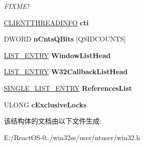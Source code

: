 \begin{DoxyCompactItemize}
\begin{DoxyCompactList}\small\item\em F\+I\+X\+M\+E! \end{DoxyCompactList}\item 
\mbox{\label{struct___t_h_r_e_a_d_i_n_f_o_a4919788349996364c773ff0e360948fd}} 
\hyperlink{struct___c_l_i_e_n_t_t_h_r_e_a_d_i_n_f_o}{C\+L\+I\+E\+N\+T\+T\+H\+R\+E\+A\+D\+I\+N\+FO} {\bfseries cti}
\item 
\mbox{\label{struct___t_h_r_e_a_d_i_n_f_o_a59f0a95c0b8c3ad56bc56025ae1da40e}} 
D\+W\+O\+RD {\bfseries n\+Cnts\+Q\+Bits} \mbox{[}Q\+S\+I\+D\+C\+O\+U\+N\+TS\mbox{]}
\item 
\mbox{\label{struct___t_h_r_e_a_d_i_n_f_o_ae2159bae996632c73543e0a053a2172f}} 
\hyperlink{struct___l_i_s_t___e_n_t_r_y}{L\+I\+S\+T\+\_\+\+E\+N\+T\+RY} {\bfseries Window\+List\+Head}
\item 
\mbox{\label{struct___t_h_r_e_a_d_i_n_f_o_a7e1378ab0d532fb704aea4f3cb832a3c}} 
\hyperlink{struct___l_i_s_t___e_n_t_r_y}{L\+I\+S\+T\+\_\+\+E\+N\+T\+RY} {\bfseries W32\+Callback\+List\+Head}
\item 
\mbox{\label{struct___t_h_r_e_a_d_i_n_f_o_ac140468af8c00df2b76aa0e37fa865de}} 
\hyperlink{struct___s_i_n_g_l_e___l_i_s_t___e_n_t_r_y}{S\+I\+N\+G\+L\+E\+\_\+\+L\+I\+S\+T\+\_\+\+E\+N\+T\+RY} {\bfseries References\+List}
\item 
\mbox{\label{struct___t_h_r_e_a_d_i_n_f_o_a49edabbd99c4a940957ee3a02ad30898}} 
U\+L\+O\+NG {\bfseries c\+Exclusive\+Locks}
\end{DoxyCompactItemize}


该结构体的文档由以下文件生成\+:\begin{DoxyCompactItemize}
\item 
E\+:/\+React\+O\+S-\/0../win32ss/user/ntuser/win32.\+h\end{DoxyCompactItemize}
